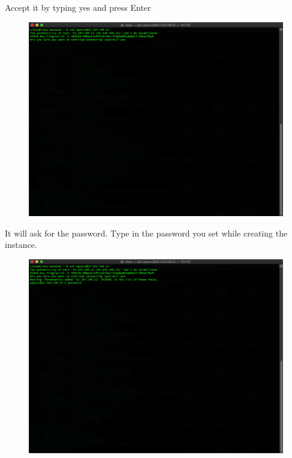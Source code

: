 Accept it by typing yes and press Enter

\begin{figure}[H]
\begin{center} 
\includegraphics[scale=0.40]{figures/ssh5}
\end{center}
\end{figure}

It will ask for the password. Type in the password you set while creating the instance.

\begin{figure}[H]
\begin{center} 
\includegraphics[scale=0.40]{figures/ssh6}
\end{center}
\end{figure}

